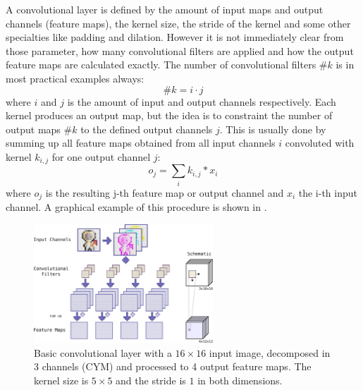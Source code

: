 A convolutional layer is defined by the amount of input maps and output channels (feature maps), the kernel size, the stride of the kernel and some other specialties like padding and dilation.
However it is not immediately clear from those parameter, how many convolutional filters are applied and how the output feature maps are calculated exactly.
The number of convolutional filters $\#k$ is in most practical examples always:
\begin{equation}\label{eq:nn_theory_n_filters}
  \#k = i \cdot j
\end{equation}
where $i$ and $j$ is the amount of input and output channels respectively.
Each kernel produces an output map, but the idea is to constraint the number of output maps $\#k$ to the defined output channels $j$.
This is usually done by summing up all feature maps obtained from all input channels $i$ convoluted with kernel $k_{i, j}$ for one output channel $j$:
\begin{equation}
  o_j = \sum_{i} k_{i, j} \ast x_i
\end{equation}
where $o_j$ is the resulting j-th feature map or output channel and $x_i$ the i-th input channel.
A graphical example of this procedure is shown in .
\begin{figure}[!ht]
  \centering
    \includegraphics[width=0.6\textwidth]{./4_nn/figs/nn_theory_cnn_basics.pdf}
  \caption{Basic convolutional layer with a $16 \times 16$ input image, decomposed in 3 channels (CYM) and processed to 4 output feature maps. The kernel size is $5 \times 5$ and the stride is $1$ in both dimensions.}
  \label{fig:nn_theory_cnn_basics}
\end{figure}
\FloatBarrier
\noindent

